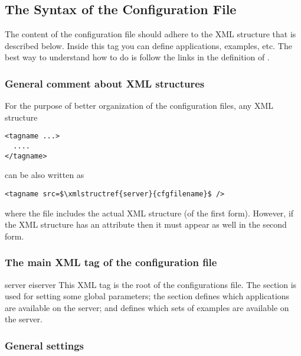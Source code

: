 \subsection{The Syntax of the Configuration File}
\label{ch:server:config:xml}

The content of the configuration file should adhere to the
 XML structure that is described below.
%
Inside this tag you can define applications, examples, etc. The best
way to understand how to do is follow the links in the definition of
.

\subsubsection*{General comment about XML structures} 

For the purpose of better organization of the configuration files, any
XML structure

\medskip
\begin{lstlisting}
<tagname ...>
  ....
</tagname>
\end{lstlisting}

\medskip
\noindent
can be also written as

\medskip
\begin{lstlisting}
<tagname src=$\xmlstructref{server}{cfgfilename}$ />
\end{lstlisting}

\medskip
\noindent
where the file  includes the actual XML
structure (of the first form). However, if the XML structure has an
attribute  then it must appear as well in the second form.

\subsubsection*{The main XML tag of the configuration file}

\bigskip
\xmlstruct
{server}
{eiserver}
{%
This XML tag is the root of the configurations file.
%
The  section is used for setting some global
parameters; the  section defines which applications
are available on the server; and  defines which
sets of examples are available on the server.
%
}



\subsubsection*{General settings}

